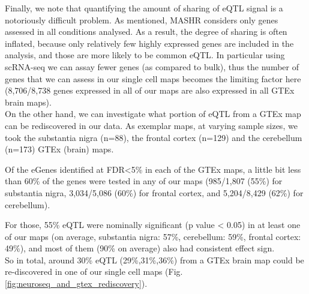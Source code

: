 Finally, we note that quantifying the amount of sharing of eQTL signal is a notoriously difficult problem.
As mentioned, MASHR considers only genes assessed in all conditions analysed. 
As a result, the degree of sharing is often inflated, because only relatively few highly expressed genes are included in the analysis, and those are more likely to be common eQTL. 
In particular using scRNA-seq we can assay fewer genes (as compared to bulk), thus the number of genes that we can assess in our single cell maps becomes the limiting factor here (8,706/8,738 genes expressed in all of our maps are also expressed in all GTEx brain maps).\\


On the other hand,
we can investigate what portion of eQTL from a GTEx map can be rediscovered in our data.
As exemplar maps, at varying sample sizes, we took the substantia nigra (n=88), the frontal cortex (n=129) and the cerebellum (n=173) GTEx (brain) maps.

Of the eGenes identified at FDR<5\% in each of the GTEx maps, a little bit less than 60\% of the genes were tested in any of our maps 
(985/1,807 (55\%) for substantia nigra,
3,034/5,086 (60\%) for frontal cortex, 
and 5,204/8,429 (62\%) for cerebellum).

For those, 55\% eQTL were nominally significant (p value < 0.05) in at least one of our maps (on average, substantia nigra: 57\%, cerebellum: 59\%, frontal cortex: 49\%), 
and most of them
(90\% on average) also had consistent effect sign. \\

So in total, around 30\% eQTL (29\%,31\%,36\%)
from a GTEx brain map could be re-discovered in one of our single cell maps (Fig. \ref{fig:neuroseq_and_gtex_rediscovery}).


